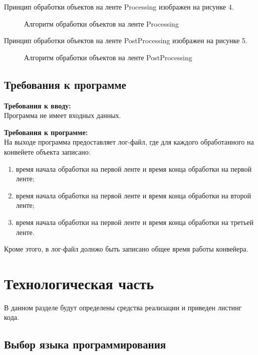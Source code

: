 \documentclass[a4paper,14pt]{report}
\begin{document}
Принцип обработки объектов на ленте Processing изображен на рисунке 4.

\begin{figure}
\caption{Алгоритм обработки объектов на ленте Processing}
\label{fig:image}
\end{figure}

Принцип обработки объектов на ленте PostProcessing изображен на рисунке 5.

\begin{figure}
\caption{Алгоритм обработки объектов на ленте PostProcessing}
\label{fig:image}
\end{figure}

\section*{Требования к программе}

\textbf{Требования к вводу:}\\
Программа не имеет входных данных.

\textbf{Требования к программе:}\\
На выходе программа предоставляет лог-файл, где для каждого обработанного на конвейете объекта записано:
\begin{enumerate}
	\item время начала обработки на первой ленте и время конца обработки на первой ленте;
	\item время начала обработки на первой ленте и время конца обработки на второй ленте;
	\item время начала обработки на первой ленте и время конца обработки на третьей ленте.
\end{enumerate}

Кроме этого, в лог-файл долнжо быть записано общее время работы конвейера.

\chapter*{Технологическая часть}

В данном разделе будут определены средства реализации и приведен листинг кода.

\section*{Выбор языка программирования}
\end{document}
